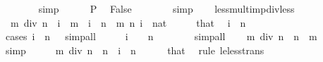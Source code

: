 \begin{isabellebody}
\ \ \ \ \ \ \isamarkupfalse%
\ simp\isanewline
\ \ \ \ \isamarkupfalse%
\ P\ \isamarkupfalse%
\ False\isanewline
\ \ \ \ \ \ \isamarkupfalse%
\ simp\isanewline
\ \ \isamarkupfalse%
\isanewline
{}\isamarkupfalse%
%
\endisatagproof
{\isafoldproof}%
%
\isadelimproof
\isanewline
%
\endisadelimproof
\isanewline
{}\isamarkupfalse%
\ less{\isacharunderscore}{\kern0pt}mult{\isacharunderscore}{\kern0pt}imp{\isacharunderscore}{\kern0pt}div{\isacharunderscore}{\kern0pt}less{\isacharcolon}{\kern0pt}\isanewline
\ \ {\isachardoublequoteopen}m\ div\ n\ {\isacharless}{\kern0pt}\ i{\isachardoublequoteclose}\ \ {\isachardoublequoteopen}m\ {\isacharless}{\kern0pt}\ i\ {\isacharasterisk}{\kern0pt}\ n{\isachardoublequoteclose}\ \ m\ n\ i\ {\isacharcolon}{\kern0pt}{\isacharcolon}{\kern0pt}\ nat\isanewline
%
\isadelimproof
%
\endisadelimproof
%
\isatagproof
{}\isamarkupfalse%
\ {\isacharminus}{\kern0pt}\isanewline
\ \ \isamarkupfalse%
\ that\ \isamarkupfalse%
\ {\isachardoublequoteopen}i\ {\isacharasterisk}{\kern0pt}\ n\ {\isachargreater}{\kern0pt}\ {}{\isachardoublequoteclose}\isanewline
\ \ \ \ \isamarkupfalse%
\ {\isacharparenleft}{\kern0pt}cases\ {\isachardoublequoteopen}i\ {\isacharasterisk}{\kern0pt}\ n\ {\isacharequal}{\kern0pt}\ {}{\isachardoublequoteclose}{\isacharparenright}{\kern0pt}\ simp{\isacharunderscore}{\kern0pt}all\isanewline
\ \ \isamarkupfalse%
\ \isamarkupfalse%
\ {\isachardoublequoteopen}i\ {\isachargreater}{\kern0pt}\ {}{\isachardoublequoteclose}\ \ {\isachardoublequoteopen}n\ {\isachargreater}{\kern0pt}\ {}{\isachardoublequoteclose}\isanewline
\ \ \ \ \isamarkupfalse%
\ simp{\isacharunderscore}{\kern0pt}all\isanewline
\ \ \isamarkupfalse%
\ {\isachardoublequoteopen}m\ div\ n\ {\isacharasterisk}{\kern0pt}\ n\ {\isasymle}\ m{\isachardoublequoteclose}\isanewline
\ \ \ \ \isamarkupfalse%
\ simp\isanewline
\ \ \isamarkupfalse%
\ \isamarkupfalse%
\ {\isachardoublequoteopen}m\ div\ n\ {\isacharasterisk}{\kern0pt}\ n\ {\isacharless}{\kern0pt}\ i\ {\isacharasterisk}{\kern0pt}\ n{\isachardoublequoteclose}\isanewline
\ \ \ \ \isamarkupfalse%
\ that\ \isamarkupfalse%
\ {\isacharparenleft}{\kern0pt}rule\ le{\isacharunderscore}{\kern0pt}less{\isacharunderscore}{\kern0pt}trans{\isacharparenright}{\kern0pt}\isanewline

\end{isabellebody}

